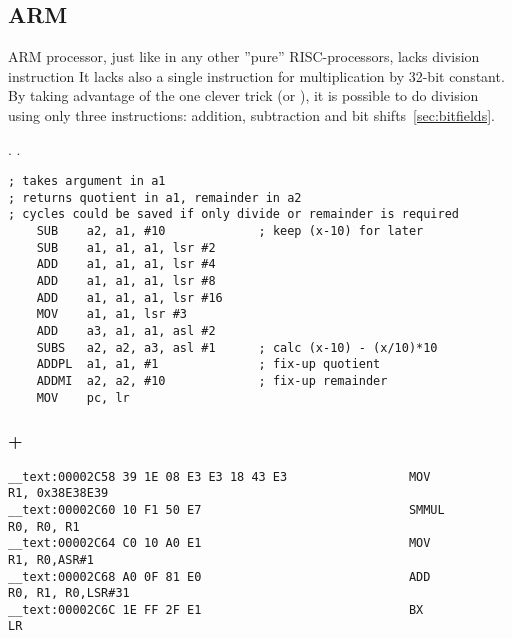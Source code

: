 

\subsection{ARM}

{ARM processor, just like in any other ''pure'' RISC-processors, lacks division instruction
It lacks also a single instruction for multiplication by 32-bit constant.}
{By taking advantage of the one clever trick (or ), it is possible to do division using only three instructions: addition,
subtraction and bit shifts}~\ref{sec:bitfields}.

\cite[3.3 Division by a Constant]{ARM:1994}.
.

\begin{lstlisting}
; takes argument in a1
; returns quotient in a1, remainder in a2
; cycles could be saved if only divide or remainder is required
    SUB    a2, a1, #10             ; keep (x-10) for later
    SUB    a1, a1, a1, lsr #2
    ADD    a1, a1, a1, lsr #4
    ADD    a1, a1, a1, lsr #8
    ADD    a1, a1, a1, lsr #16
    MOV    a1, a1, lsr #3
    ADD    a3, a1, a1, asl #2
    SUBS   a2, a2, a3, asl #1      ; calc (x-10) - (x/10)*10
    ADDPL  a1, a1, #1              ; fix-up quotient
    ADDMI  a2, a2, #10             ; fix-up remainder
    MOV    pc, lr
\end{lstlisting}

\subsubsection{\OptimizingXcode + \ARMMode}

\begin{lstlisting}
__text:00002C58 39 1E 08 E3 E3 18 43 E3                 MOV             R1, 0x38E38E39
__text:00002C60 10 F1 50 E7                             SMMUL           R0, R0, R1
__text:00002C64 C0 10 A0 E1                             MOV             R1, R0,ASR#1
__text:00002C68 A0 0F 81 E0                             ADD             R0, R1, R0,LSR#31
__text:00002C6C 1E FF 2F E1                             BX              LR
\end{lstlisting}

